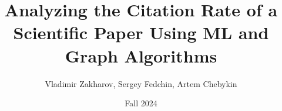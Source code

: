 
% 
\documentclass{article}
\usepackage{graphicx} %
\usepackage{hyperref} %
\usepackage{amsmath}
\usepackage{multirow}
\graphicspath{ {./images/} }
\newcommand\tab[1][1cm]{\hspace*{#1}}
\title{Analyzing the Citation Rate of a Scientific Paper Using ML and Graph Algorithms}
\author{Vladimir Zakharov, Sergey Fedchin, Artem Chebykin}
\date{Fall 2024}



\maketitle


